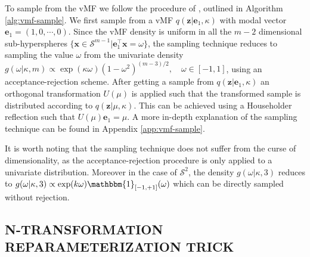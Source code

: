 \documentclass[letterpaper]{article}
\newcommand{\x}{\mathbf{x}}
\newcommand{\z}{\mathbf{z}}
\newcommand{\e}{\mathbf{e}}
\begin{document}
To sample from the vMF we follow the procedure of \citet{sample-vmf}, outlined in Algorithm \ref{alg:vmf-sample}. We first sample from a vMF $q(\z| \e_1 , \kappa)$ with modal vector $\e_1 = (1, 0, \cdots, 0)$. Since the vMF density is uniform in all the $m-2$ dimensional sub-hyperspheres $\{\x \in \mathcal{S}^{m-1}| \e_1^\top \x = \omega\}$, the sampling technique reduces to sampling the value $\omega$ from the univariate density $g(\omega|\kappa,m)\propto \exp(\kappa \omega)(1-\omega^2)^{(m-3)/2}, \quad \omega\in[-1,1]$, using an acceptance-rejection scheme. After getting a sample from  $q(\z| \e_1 , \kappa)$  an orthogonal transformation $U(\mu)$ is applied such that the transformed sample is distributed according to $q(\z|\mu , \kappa)$.
This can be achieved using a Householder reflection such that $U(\mu)\e_1 = \mu$. A more in-depth explanation of the sampling technique can be found in Appendix \ref{app:vmf-sample}. 

It is worth noting that the sampling technique does not suffer from the curse of dimensionality, as the acceptance-rejection procedure is only applied to a univariate distribution. Moreover in the case of $\mathcal{S}^2$, the density $g(\omega|\kappa,3)$ reduces to $g(\omega|\kappa,3)\propto \exp(k\omega)\mathbbm{1}_{[-1,+1]}(\omega)$ which can be directly sampled without rejection.

\subsection{N-TRANSFORMATION REPARAMETERIZATION TRICK}\label{sec:reparameterization}
\end{document}
